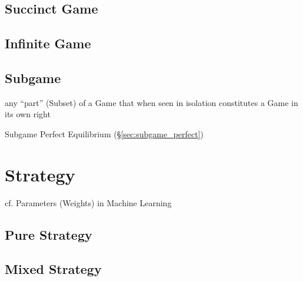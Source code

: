 \subsection{Succinct Game}\label{sec:succinct_game}

\subsection{Infinite Game}\label{sec:infinite_game}

\subsection{Subgame}\label{sec:subgame}

any ``part'' (Subset) of a Game that when seen in isolation constitutes a Game
in its own right

Subgame Perfect Equilibrium (\S\ref{sec:subgame_perfect})



\section{Strategy}\label{sec:strategy}

cf. Parameters (Weights) in Machine Learning



\subsection{Pure Strategy}\label{sec:pure_strategy}

\subsection{Mixed Strategy}\label{sec:mixed_strategy}



